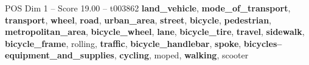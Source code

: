 \begin{textsample}{POS Dim 1 – Score 19.00 – t003862}  \label{ex:f1_pos_021}
\textbf{land\_vehicle}, \textbf{mode\_of\_transport}, \textbf{transport}, \textbf{wheel}, \textbf{road}, \textbf{urban\_area}, \textbf{street}, \textbf{bicycle}, \textbf{pedestrian}, \textbf{metropolitan\_area}, \textbf{bicycle\_wheel}, \textbf{lane}, \textbf{bicycle\_tire}, \textbf{travel}, \textbf{sidewalk}, \textbf{bicycle\_frame}, rolling, \textbf{traffic}, \textbf{bicycle\_handlebar}, \textbf{spoke}, \textbf{bicycles--equipment\_and\_supplies}, \textbf{cycling}, moped, \textbf{walking}, scooter

\end{textsample}
